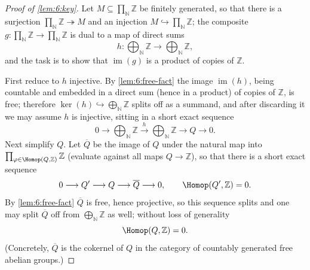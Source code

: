 \begin{proof}[Proof of \cref{lem:6:key}]
Let $M\subseteq\prod_{\mathbb{N}}\mathbb{Z}$ be finitely generated, so that there
is a surjection $\prod_{\mathbb{N}}\mathbb{Z}\twoheadrightarrow M$ and an
injection $M\hookrightarrow\prod_{\mathbb{N}}\mathbb{Z}$; the composite
$g\colon\prod_{\mathbb{N}}\mathbb{Z}\to\prod_{\mathbb{N}}\mathbb{Z}$ is dual to a
map of direct sums
\begin{equation*}
h\colon\bigoplus_{\mathbb{N}}\mathbb{Z}\longrightarrow\bigoplus_{\mathbb{N}}\mathbb{Z},
\end{equation*}
and the task is to show that $\operatorname{im}(g)$ is a product of copies of
$\mathbb{Z}$.

First reduce to $h$ injective. By \cref{lem:6:free-fact} the image
$\operatorname{im}(h)$, being countable and embedded in a direct sum (hence in a
product) of copies of $\mathbb{Z}$, is free; therefore
$\ker(h)\hookrightarrow\bigoplus_{\mathbb{N}}\mathbb{Z}$ splits off as a summand,
and after discarding it we may assume $h$ is injective, sitting in a short exact
sequence
\begin{equation}
\label{eq:6:h-ses}
0\longrightarrow\bigoplus_{\mathbb{N}}\mathbb{Z}\xrightarrow{\ h\ }
\bigoplus_{\mathbb{N}}\mathbb{Z}\longrightarrow Q\longrightarrow0.
\end{equation}
Next simplify $Q$. Let $\overline{Q}$ be the image of $Q$ under the natural map
into $\prod_{\varphi\in\Homop(Q,\mathbb{Z})}\mathbb{Z}$ (evaluate against all maps
$Q\to\mathbb{Z}$), so that there is a short exact sequence
\begin{equation*}
0\longrightarrow Q'\longrightarrow Q\longrightarrow\overline{Q}\longrightarrow0,
\qquad \Homop(Q',\mathbb{Z})=0 .
\end{equation*}
By \cref{lem:6:free-fact} $\overline{Q}$ is free, hence projective, so this
sequence splits and one may split $\overline{Q}$ off from
$\bigoplus_{\mathbb{N}}\mathbb{Z}$ as well; without loss of generality
\begin{equation*}
\Homop(Q,\mathbb{Z})=0 .
\end{equation*}
(Concretely, $\overline{Q}$ is the cokernel of $Q$ in the category of countably
generated free abelian groups.)


\end{proof}
